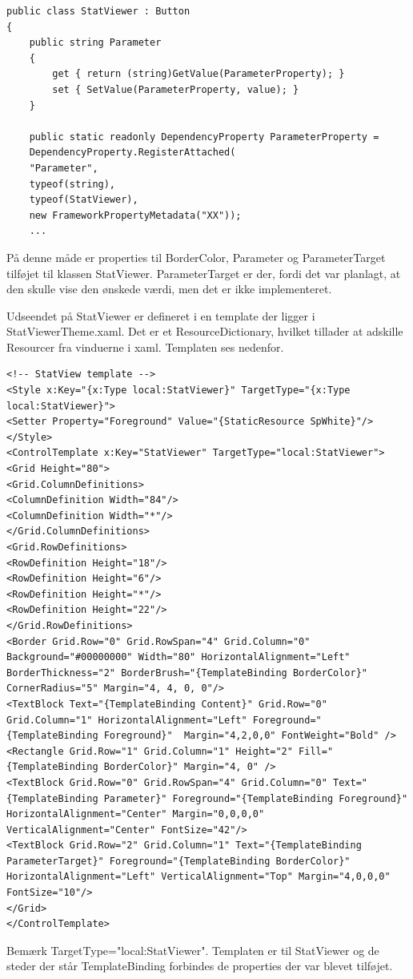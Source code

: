 \begin{lstlisting}[caption=StatViewer attatched property, label=code:StatViewer]
public class StatViewer : Button
{
	public string Parameter
	{
		get { return (string)GetValue(ParameterProperty); }
		set { SetValue(ParameterProperty, value); }
	}
	
	public static readonly DependencyProperty ParameterProperty =
	DependencyProperty.RegisterAttached(
	"Parameter",
	typeof(string),
	typeof(StatViewer),
	new FrameworkPropertyMetadata("XX"));
	...
\end{lstlisting}

På denne måde er properties til BorderColor, Parameter og ParameterTarget tilføjet til klassen StatViewer. ParameterTarget er der, fordi det var planlagt, at den skulle vise den ønskede værdi, men det er ikke implementeret.

Udseendet på StatViewer er defineret i en template der ligger i StatViewerTheme.xaml. Det er et ResourceDictionary, hvilket tillader at adskille Resourcer fra vinduerne i xaml.
Templaten ses nedenfor.

\begin{lstlisting}[caption=StatViewerTheme, label=code:asd3]
<!-- StatView template -->
<Style x:Key="{x:Type local:StatViewer}" TargetType="{x:Type local:StatViewer}">
<Setter Property="Foreground" Value="{StaticResource SpWhite}"/>
</Style>
<ControlTemplate x:Key="StatViewer" TargetType="local:StatViewer">
<Grid Height="80">
<Grid.ColumnDefinitions>
<ColumnDefinition Width="84"/>
<ColumnDefinition Width="*"/>
</Grid.ColumnDefinitions>
<Grid.RowDefinitions>
<RowDefinition Height="18"/>
<RowDefinition Height="6"/>
<RowDefinition Height="*"/>
<RowDefinition Height="22"/>
</Grid.RowDefinitions>
<Border Grid.Row="0" Grid.RowSpan="4" Grid.Column="0" Background="#00000000" Width="80" HorizontalAlignment="Left" BorderThickness="2" BorderBrush="{TemplateBinding BorderColor}" CornerRadius="5" Margin="4, 4, 0, 0"/>
<TextBlock Text="{TemplateBinding Content}" Grid.Row="0"  Grid.Column="1" HorizontalAlignment="Left" Foreground="{TemplateBinding Foreground}"  Margin="4,2,0,0" FontWeight="Bold" />
<Rectangle Grid.Row="1" Grid.Column="1" Height="2" Fill="{TemplateBinding BorderColor}" Margin="4, 0" />
<TextBlock Grid.Row="0" Grid.RowSpan="4" Grid.Column="0" Text="{TemplateBinding Parameter}" Foreground="{TemplateBinding Foreground}" HorizontalAlignment="Center" Margin="0,0,0,0" VerticalAlignment="Center" FontSize="42"/>
<TextBlock Grid.Row="2" Grid.Column="1" Text="{TemplateBinding ParameterTarget}" Foreground="{TemplateBinding BorderColor}" HorizontalAlignment="Left" VerticalAlignment="Top" Margin="4,0,0,0" FontSize="10"/>
</Grid>
</ControlTemplate>
\end{lstlisting}

Bemærk TargetType="local:StatViewer". Templaten er til StatViewer og de steder der står TemplateBinding forbindes de properties der var blevet tilføjet.
